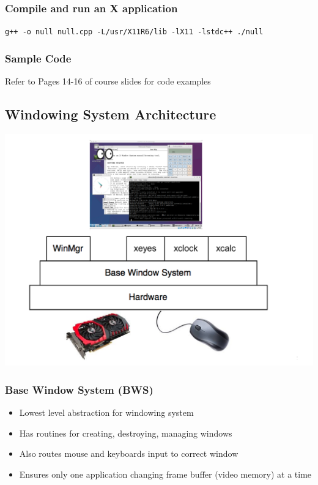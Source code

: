\documentclass[twoside]{article}
\begin{document}
\subsubsection{Compile and run an X application}
\verb|g++ -o null null.cpp -L/usr/X11R6/lib -lX11 -lstdc++ ./null|

\subsubsection{Sample Code}
Refer to Pages 14-16 of course slides for code examples 

\subsection{Windowing System Architecture}
\begin{center}
\includegraphics[scale=0.2]{3}
\end{center}

\subsubsection{Base Window System (BWS)}
\begin{itemize}
\item Lowest level abstraction for windowing system 
\item Has routines for creating, destroying, managing windows
\item Also routes mouse and keyboards input to correct window 
\item Ensures only one application changing frame buffer (video memory) at a time
\end{itemize}
\end{document}
